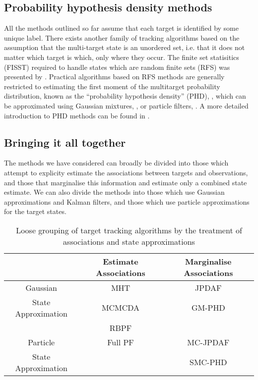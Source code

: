 \subsection{Probability hypothesis density methods}
All the methods outlined so far assume that each target is identified by some unique label. There exists another family of tracking algorithms based on the assumption that the multi-target state is an unordered set, i.e. that it does not matter which target is which, only where they occur. The finite set statisitics (FISST) required to handle states which are random finite sets (RFS) was presented by \cite{Mahler1994}. Practical algorithms based on RFS methods are generally restricted to estimating the first moment of the multitarget probability distribution, known as the ``probability hypothesis density'' (PHD), \cite{Mahler2003}, which can be approximated using Gaussian mixtures, \cite{Vo2006}, or particle filters, \cite{Vo2005,Whiteley2010}. A more detailed introduction to PHD methods can be found in \cite{Mahler2004,Wood2010}.



\subsection{Bringing it all together}
The methods we have considered can broadly be divided into those which attempt to explicity estimate the associations between targets and observations, and those that marginalise this information and estimate only a combined state estimate. We can also divide the methods into those which use Gaussian approximations and Kalman filters, and those which use particle approximations for the target states.

\begin{table}[!hbt]%
\begin{center}\begin{tabular}{|c|c|c|}
\hline
 & Estimate Associations & Marginalise Associations\\
\hline
Gaussian & MHT & JPDAF \\
State Approximation & MCMCDA & GM-PHD \\ 
 & RBPF & \\
\hline
Particle & Full PF & MC-JPDAF \\
State Approximation & & SMC-PHD \\
\hline
\end{tabular}\end{center}
\caption{Loose grouping of target tracking algorithms by the treatment of associations and state approximations}
\label{}
\end{table}

